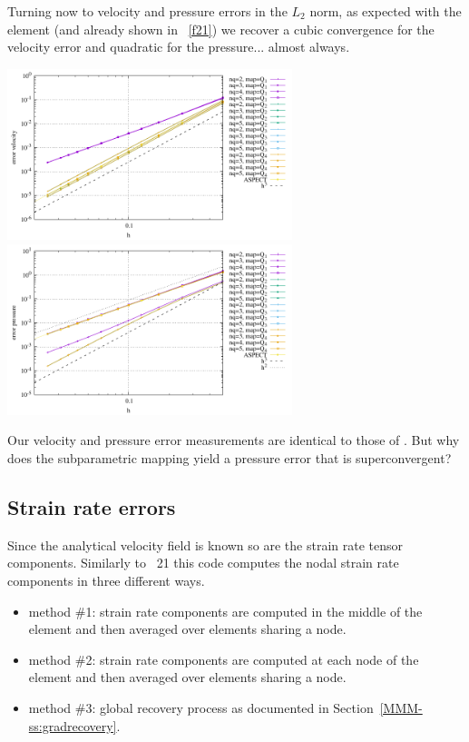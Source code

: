 Turning now to velocity and pressure errors in the $L_2$ norm, 
as expected with the \QtwoQone element (and already shown in \stone~\ref{f21})
we recover a cubic convergence for the velocity error and quadratic for the 
pressure... almost always.

\begin{center}
\includegraphics[width=8.3cm]{python_codes/fieldstone_152/results/exp0/errv}
\includegraphics[width=8.3cm]{python_codes/fieldstone_152/results/exp0/errp}
\end{center}

Our velocity and pressure error measurements are identical to those of \aspect.
But why does the subparametric mapping yield a pressure error that is superconvergent?


\newpage

\subsection*{Strain rate errors}

Since the analytical velocity field is known so are the strain rate tensor components.
Similarly to \stone~21 this code computes the nodal strain rate components
in three different ways. 
\begin{itemize}
\item method \#1: strain rate components are computed in the middle of the element and then averaged over elements sharing a node.
\item method \#2: strain rate components are computed at each node of the element and then averaged over elements sharing a node.
\item method \#3: global recovery process as documented in Section~\ref{MMM-ss:gradrecovery}.
\end{itemize}

